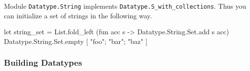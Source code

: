 \begin{example}
Module \texttt{Datatype.String} implements
\texttt{Datatype.S\_with\_collections}. Thus you can initialize a set of strings
in the following way.
\begin{ocamlcode}
let string_set =
  List.fold_left
    (fun acc s -> Datatype.String.Set.add s acc)
    Datatype.String.Set.empty
    [ "foo"; "bar"; "baz" ]
\end{ocamlcode}
\end{example}

\subsubsection{Building Datatypes}

